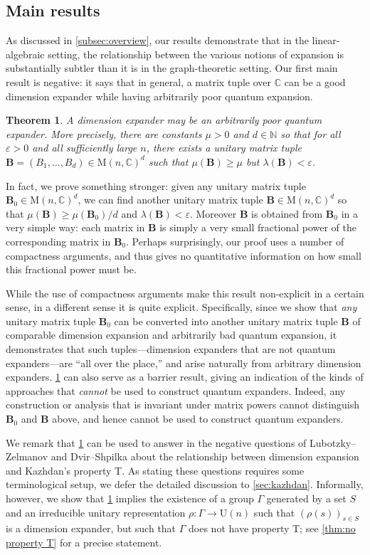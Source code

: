 \documentclass[11pt]{article}
\newtheorem{theorem}{Theorem}[section]
\newcommand{\N}{{\mathbb N}}
\theoremstyle{plain}
\numberwithin{equation}{section}
\theoremstyle{definition}
\newcommand{\bC}{\mathbb{C}}
\newcommand{\M}{\mathrm{M}}
\newcommand{\U}{\mathrm{U}}
\newcommand{\tuple}[1]{\mathbf{#1}}
\newcommand{\vB}{\tuple{B}}
\begin{document}
\subsection{Main results}
As discussed in \cref{subsec:overview}, our results demonstrate that in the linear-algebraic setting, the relationship between the various notions of expansion is substantially subtler than it is in the graph-theoretic setting. Our first main result is negative: it says that in general, a matrix tuple over $\bC$ can be a good dimension expander while having arbitrarily poor quantum expansion. 
\begin{theorem}\label{thm:main-negative}
    A dimension expander may be an arbitrarily poor quantum expander. More precisely,
    there are constants $\mu>0$ and $d \in \N$ so that for all $\varepsilon>0$ and all sufficiently large $n$, there exists a unitary matrix tuple $\vB =(B_1,\dots,B_d) \in \M(n,\bC)^d$ such that $\mu(\vB) \geq \mu$ but $\lambda(\vB) < \varepsilon$.
\end{theorem}
In fact, we prove something stronger: given any unitary matrix tuple $\vB_0 \in \M(n,\bC)^d$, we can find another unitary matrix tuple $\vB \in \M(n,\bC)^d$ so that $\mu(\vB) \geq \mu(\vB_0)/d$ and $\lambda(\vB) < \varepsilon$. Moreover $\vB$ is obtained from $\vB_0$ in a very simple way: each matrix in $\vB$ is simply a very small fractional power of the corresponding matrix in $\vB_0$. Perhaps surprisingly, our proof uses a number of compactness arguments, and thus gives no quantitative information on how small this fractional power must be.

While the use of compactness arguments make this result non-explicit in a certain sense, in a different sense it is quite explicit. 
%
%
Specifically, %
since we show that \emph{any} unitary matrix tuple $\vB_0$ can be converted into another unitary matrix tuple $\vB$ of comparable dimension expansion and arbitrarily bad quantum expansion, it demonstrates that such tuples---dimension expanders that are not quantum expanders---are ``all over the place,'' and arise naturally from arbitrary dimension expanders. \cref{thm:main-negative} can also serve as a barrier result, giving an indication of the kinds of approaches that \emph{cannot} be used to construct quantum expanders. 
%
Indeed, %
any construction or analysis that is invariant under matrix powers cannot distinguish $\vB_0$ and $\vB$ above, and hence cannot be used to construct quantum expanders.
%
%

We remark that \cref{thm:main-negative} can be used to answer in the negative questions of Lubotzky--Zelmanov \cite[Remark/Question 2.5]{LUBOTZKY2008730} and Dvir--Shpilka \cite[Question 1]{DS09} about the relationship between dimension expansion and Kazhdan's property T. As stating these questions requires some terminological setup, we defer the detailed discussion to \cref{sec:kazhdan}. Informally, however, we show that \cref{thm:main-negative} implies the existence of a group $\Gamma$ generated by a set $S$ and an irreducible unitary representation $\rho:\Gamma \to \U(n)$ such that $(\rho(s))_{s \in S}$ is a dimension expander, but such that $\Gamma$ does not have property T; see \cref{thm:no property T} for a precise statement.
\end{document}
